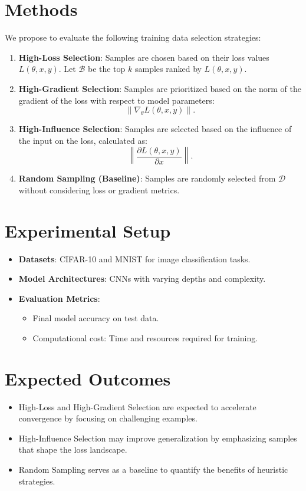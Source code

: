 \documentclass[10pt]{article}
\begin{document}
\section{Methods}
We propose to evaluate the following training data selection strategies:
\begin{enumerate}
    \item \textbf{High-Loss Selection}\cite{Loss}: Samples are chosen based on their loss values $L(\theta, x, y)$. Let $\mathcal{B}$ be the top $k$ samples ranked by $L(\theta, x, y)$.
    \item \textbf{High-Gradient Selection}\cite{Gradient}: Samples are prioritized based on the norm of the gradient of the loss with respect to model parameters:
    \[
    \|\nabla_\theta L(\theta, x, y)\|.
    \]
    \item \textbf{High-Influence Selection}\cite{Influence}: Samples are selected based on the influence of the input on the loss, calculated as:
    \[
    \left\|\frac{\partial L(\theta, x, y)}{\partial x}\right\|.
    \]
    \item \textbf{Random Sampling (Baseline)}: Samples are randomly selected from $\mathcal{D}$ without considering loss or gradient metrics.
\end{enumerate}

\section{Experimental Setup}
\begin{itemize}
    \item \textbf{Datasets}: CIFAR-10 and MNIST for image classification tasks.
    \item \textbf{Model Architectures}: CNNs with varying depths and complexity.
    \item \textbf{Evaluation Metrics}: 
    \begin{itemize}
        \item Final model accuracy on test data.
        \item Computational cost: Time and resources required for training.
    \end{itemize}
\end{itemize}

\section{Expected Outcomes}
\begin{itemize}
    \item High-Loss and High-Gradient Selection are expected to accelerate convergence by focusing on challenging examples.
    \item High-Influence Selection may improve generalization by emphasizing samples that shape the loss landscape.
    \item Random Sampling serves as a baseline to quantify the benefits of heuristic strategies.
\end{itemize}

\printbibliography
\end{document}

